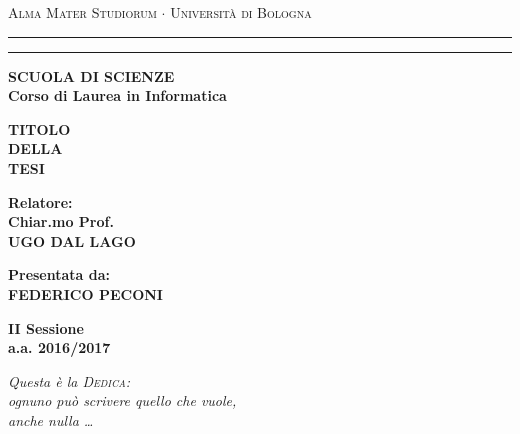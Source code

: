 \documentclass[12pt,a4paper,openright]{report}
\begin{document}
\begin{titlepage}
\begin{center}  
{{\Large{\textsc{Alma Mater Studiorum $\cdot$ Universit\`a di
Bologna}}}} \rule[0.1cm]{15.8cm}{0.1mm}
\rule[0.5cm]{15.8cm}{0.6mm}
{\small{\bf SCUOLA DI SCIENZE\\
Corso di Laurea in Informatica }}
\end{center}
\vspace{15mm}
\begin{center}
{\LARGE{\bf TITOLO}}\\
\vspace{3mm}
{\LARGE{\bf DELLA}}\\
\vspace{3mm}
{\LARGE{\bf TESI}}\\
\end{center}
\vspace{40mm}
\par
\noindent
\begin{minipage}[t]{0.47\textwidth}
{\large{\bf Relatore:\\
Chiar.mo Prof.\\
UGO DAL LAGO}}
\end{minipage}
\hfill
\begin{minipage}[t]{0.47\textwidth}\raggedleft
{\large{\bf Presentata da:\\
FEDERICO PECONI}}
\end{minipage}
\vspace{20mm}
\begin{center}
{\large{\bf II Sessione\\%
a.a. 2016/2017 }}%
\end{center}
\newpage
\thispagestyle{empty}                   %
\topmargin=6.5cm                        %
\raggedleft                             %
\large                                  %
\em                                     %
Questa \`e la \textsc{Dedica}:\\
ognuno pu\`o scrivere quello che vuole, \\
anche nulla \ldots                      %
\newpage                                %
%
\clearpage{\pagestyle{empty}\cleardoublepage}%
\end{titlepage}
\tableofcontents
\end{document}
